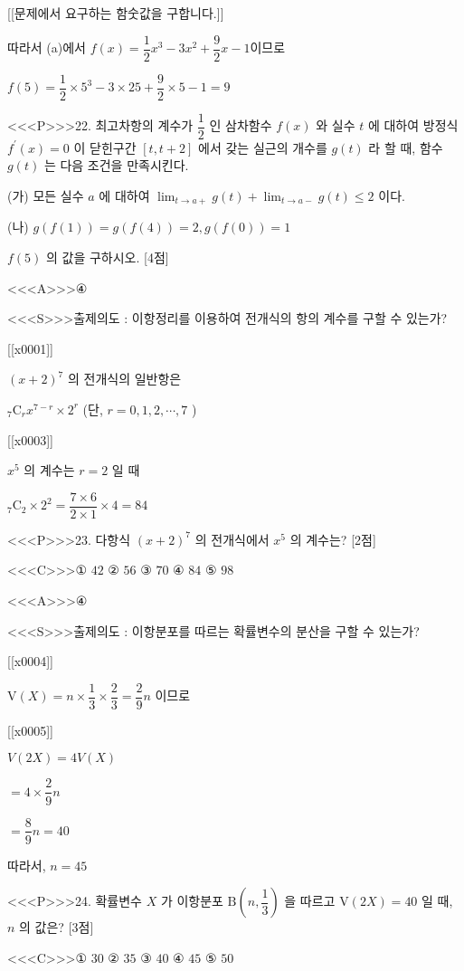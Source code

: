 \documentclass{oblivoir}
\begin{document}
[[문제에서 요구하는 함숫값을 구합니다.]]

따라서 (a)에서 $f(x) =\dfrac{1}{2} x^{3}-3 x^{2}+\dfrac{9}{2} x-1$이므로

$f(5) =\dfrac{1}{2} \times 5^{3}-3 \times 25+\dfrac{9}{2} \times 5-1 =9$


<<<P>>>22. 최고차항의 계수가 $\dfrac{1}{2}$ 인 삼차함수 $f(x)$ 와 실수 $t$ 에 대하여 방정식 $f^{\prime}(x)=0$ 이 닫힌구간 $[t, t+2]$ 에서 갖는 실근의 개수를 $g(t)$ 라 할 때, 함수 $g(t)$ 는 다음 조건을 만족시킨다.

(가) 모든 실수 $a$ 에 대하여 $\displaystyle\lim _{t \rightarrow a+} g(t)+\displaystyle\lim _{t \rightarrow a-} g(t) \leq 2$ 이다.

(나) $g(f(1))=g(f(4))=2, g(f(0))=1$

$f(5)$ 의 값을 구하시오. [4점]


<<<A>>>④

<<<S>>>출제의도 : 이항정리를 이용하여 전개식의 항의 계수를 구할 수 있는가?

[[x0001]]

$(x+2)^{7}$ 의 전개식의 일반항은

${ }_{7} \mathrm{C}_{r} x^{7-r} \times 2^{r}$ (단, $r=0,1,2, \cdots, 7$ )

[[x0003]]

$x^{5}$ 의 계수는 $r=2$ 일 때

${ }_{7} \mathrm{C}_{2} \times 2^{2}=\dfrac{7 \times 6}{2 \times 1} \times 4=84$


<<<P>>>23. 다항식 $(x+2)^{7}$ 의 전개식에서 $x^{5}$ 의 계수는? [2점]

<<<C>>>① $42$
② $56$
③ $70$
④ $84$
⑤ $98$


<<<A>>>④

<<<S>>>출제의도 : 이항분포를 따르는 확률변수의 분산을 구할 수 있는가?

[[x0004]]

$\mathrm{V}(X)=n \times \dfrac{1}{3} \times \dfrac{2}{3}=\dfrac{2}{9} n$
이므로

[[x0005]]

$V(2 X)=4 V(X)$

$=4 \times \dfrac{2}{9} n$

$=\dfrac{8}{9} n=40$

따라서, $n=45$


<<<P>>>24. 확률변수 $X$ 가 이항분포 $\mathrm{B}\left(n, \dfrac{1}{3}\right)$ 을 따르고 $\mathrm{V}(2 X)=40$ 일 때, $n$ 의 값은? [3점]

<<<C>>>① $30$
② $35$
③ $40$
④ $45$
⑤ $50$
\end{document}
